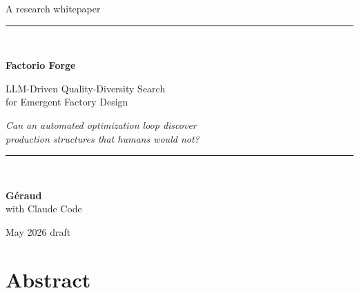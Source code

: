 \documentclass[11pt,a4paper]{article}
\begin{document}
\begin{titlepage}
\centering
\vspace*{1.5cm}

{\sffamily\color{forgeAsh}\large A research whitepaper}\\[0.4cm]
{\color{ruleGray}\rule{0.6\textwidth}{0.8pt}}\\[1.0cm]

{\sffamily\bfseries\color{forgeNavy}\Huge Factorio Forge\par}
\vspace{0.7cm}
{\sffamily\large\color{forgeSteel} LLM-Driven Quality-Diversity Search\\[0.2cm] for Emergent Factory Design\par}
\vspace{0.5cm}
{\itshape\color{forgeAsh}\large Can an automated optimization loop discover\\ production structures that humans would not?\par}

\vspace{1.4cm}
{\color{ruleGray}\rule{0.6\textwidth}{0.8pt}}\\[1.0cm]

{\large\sffamily\textbf{G\'eraud}\\[0.2cm]
\color{forgeAsh}with Claude Code\par}

\vfill


\vspace{0.8cm}
{\sffamily\color{forgeAsh}May 2026 \quad\textbullet\quad draft}
\end{titlepage}

\thispagestyle{plain}
\section*{Abstract}
\end{document}
